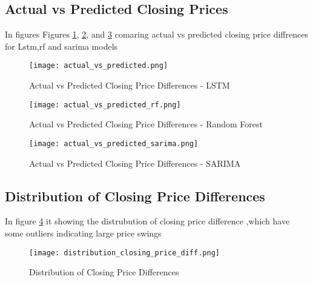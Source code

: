 \documentclass{article}
\begin{document}
\subsection{Actual vs Predicted Closing Prices}
In figures Figures \ref{fig:lstm}, \ref{fig:rf}, and \ref{fig:sarima} comaring actual vs predicted closing price diffrences for Lstm,rf and sarima models 
\begin{figure}[H]
    \centering
    \texttt{[image: actual\_vs\_predicted.png]}
    \caption{Actual vs Predicted Closing Price Differences - LSTM}
    \label{fig:lstm}
\end{figure}

\begin{figure}[H]
    \centering
    \texttt{[image: actual\_vs\_predicted\_rf.png]}
    \caption{Actual vs Predicted Closing Price Differences - Random Forest}
    \label{fig:rf}
\end{figure}

\begin{figure}[H]
    \centering
    \texttt{[image: actual\_vs\_predicted\_sarima.png]}
    \caption{Actual vs Predicted Closing Price Differences - SARIMA}
    \label{fig:sarima}
\end{figure}

\subsection{Distribution of Closing Price Differences}
In figure \ref{fig:dist} it showing the distrubution of closing price difference ,which have some outliers indicating large price swings

\begin{figure}[H]
    \centering
    \texttt{[image: distribution\_closing\_price\_diff.png]}
    \caption{Distribution of Closing Price Differences}
    \label{fig:dist}
\end{figure}
\end{document}
